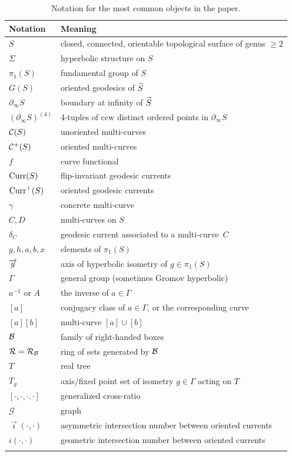 \begin{table}[ht!]
    \begin{tabular}{@{}ll@{}}
      \toprule
      Notation & Meaning \\
      \midrule
         $S$ &  closed, connected, orientable topological surface of genus $\geq 2$ \\
         $\Sigma$ &  hyperbolic structure on $S$ \\
         $\pi_1(S)$ &  fundamental group of $S$ \\
         $G(S)$ &  oriented geodesics of $\widetilde{S}$ \\
         $\partial_{\infty}S$ &  boundary at infinity of $\widetilde{S}$ \\        
        $(\partial _\infty S)^{(4)}$ & 4-tuples of ccw distinct ordered points in $\partial_\infty S$ \\
         $\mathcal{C}(S)$ & unoriented multi-curves \\
         $\mathcal{C}^+(S)$ & oriented multi-curves \\
         $f$ & curve functional \\
         $\operatorname{Curr}(S)$ & flip-invariant geodesic currents \\
         $\operatorname{Curr}^+(S)$ & oriented geodesic currents \\
         $\gamma$ & concrete multi-curve \\
         $C,D$ & multi-curves on $S$\\
         $\delta_C$ & geodesic current associated to a multi-curve~$C$\\
         $g,h,a,b,x$ & elements of $\pi_1(S)$ \\ 
         $\overrightarrow{g}$ & axis of hyperbolic isometry of $g \in \pi_1(S)$ \\  
         $\Gamma$ & general group (sometimes Gromov hyperbolic) \\
         $a^{-1}$ or $A$ & the inverse of $a \in \Gamma$ \\ 
         $[a]$ & conjugacy class of $a \in \Gamma$, or the
                 corresponding curve \\
         $[a][b]$ & multi-curve $[a] \cup [b]$ \\
         $\mathcal{B}$ & family of right-handed boxes \\ 
         $\mathcal{R} = \mathcal{R}_{\mathcal{B}}$ & ring of sets generated by $\mathcal{B}$ \\
         $T$ & real tree \\
         $T_g$ & axis/fixed point set of isometry $g \in \Gamma$ acting on $T$ \\ 
        $[\cdot,\cdot,\cdot, \cdot ]$ & generalized cross-ratio \\
        $\mathcal{G}$ & graph\\ 
        $\vec{\imath}(\cdot, \cdot)$ & asymmetric intersection number between oriented currents \\
        $i(\cdot, \cdot)$ &  geometric intersection number between oriented currents \\ \bottomrule\addlinespace
    \end{tabular}
  \caption{Notation for the most common objects in the paper.}\label{tab:object-notation}
\end{table} 

